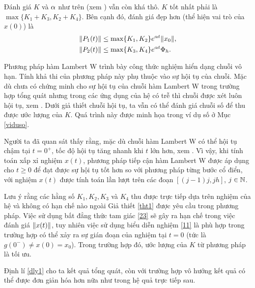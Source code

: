\begin{nx}
    Đánh giá $K$ và $\alpha$ như trên (xem \cite{Dua12}) vẫn còn khá thô. $K$ tốt nhất phải là $\max \{K_1 + K_3, K_2 + K_4 \}$. Bên cạnh đó, đánh giá đẹp hơn (thể hiện vai trò của $x(0)$) là
    \begin{subequations}
    \begin{align}
      &\Vert P_1(t) \Vert \le \max \{ K_1, K_2 \} e^{\alpha t} \Vert x_0 \Vert,  \\
      &\Vert P_2(t) \Vert \le \max \{ K_3, K_4 \} e^{\alpha t} \Phi_h.
    \end{align}
    \end{subequations}
\end{nx}
\begin{nx} Phương pháp hàm Lambert W trình bày công thức nghiệm hiển dạng chuỗi vô hạn. Tính khả thi của phương pháp này phụ thuộc vào sự hội tụ của chuỗi. Mặc dù chưa có chứng minh cho sự hội tụ của chuỗi hàm Lambert W trong trường hợp tổng quát nhưng trong các ứng dụng của hệ có trễ thì chuỗi được xét luôn hội tụ, xem \cite{Yi10}. Dưới giả thiết chuỗi hội tụ, ta vẫn có thể đánh giá chuỗi số để thu được ước lượng của $K$. Quá trình này được minh họa trong ví dụ số ở Mục \ref{viduso}.
\end{nx}

\begin{nx}
Người ta đã quan sát thấy rằng, mặc dù chuỗi hàm Lambert W có thể hội tụ chậm tại $t = 0^+$, tốc độ hội tụ tăng nhanh khi $t$ lớn hơn, xem \cite{Yi10}. 
Vì vậy, khi tính toán xấp xỉ nghiệm $x(t)$, phương pháp tiếp cận hàm Lambert W được áp dụng cho $t \ge 0$ để đạt được sự hội tụ tốt hơn so với phương pháp từng bước cổ điển, với nghiệm $x(t)$ được tính toán lần lượt trên các đoạn $[(j-1)j,jh]$, $j\in \mathbb{N}$. 
\end{nx}

\begin{nx}
	Lưu ý rằng các hằng số $K_1, K_2, K_3$ và $K_4$ thu được trực tiếp dựa trên nghiệm của hệ và không có hạn chế nào ngoài Giả thiết \ref{tht1} được yêu cầu trong phương pháp. Việc sử dụng bất đẳng thức tam giác \eqref{23} sẽ gây ra hạn chế trong việc đánh giá $\Vert x(t)\Vert$, tuy nhiên việc sử dụng biểu diễn nghiệm \eqref{11} là phù hợp trong trường hợp có thể xảy ra sự gián đoạn của nghiệm tại $t = 0$ (tức là $g(0^-) \ne x(0) =x_0$). Trong trường hợp đó, ước lượng của $K$ từ phương pháp là tối ưu.
\end{nx}	
	
Định lí \ref{dly1} cho ta kết quả tổng quát, còn với trường hợp vô hướng kết quả có thể được đơn giản hóa hơn nữa như trong hệ quả trực tiếp sau.

